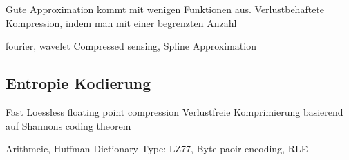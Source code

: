 Gute Approximation kommt mit wenigen Funktionen aus.
Verlustbehaftete Kompression, indem man mit einer begrenzten Anzahl

fourier, wavelet Compressed sensing, Spline Approximation

\subsection{Entropie Kodierung}
Fast Loessless floating point compression \cite{ratanaworabhan2006fast}
Verlustfreie Komprimierung basierend auf Shannons coding theorem

 Arithmeic, Huffman
Dictionary Type: LZ77, Byte paoir encoding, RLE
